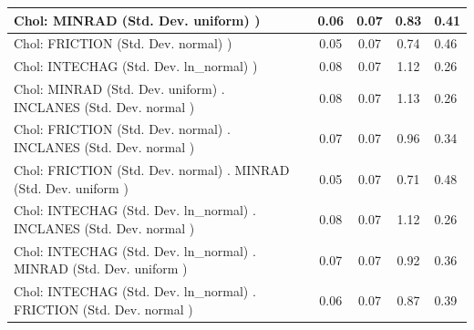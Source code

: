 \begin{table}
\begin{center}
\begin{tabular}{|l|l|c|c|c|l|}
			\hline
			 Chol: MINRAD (Std. Dev. uniform) ) &  & 0.06 & 0.07 & 0.83 & 0.41 \\
			\hline
			 Chol: FRICTION (Std. Dev. normal) ) &  & 0.05 & 0.07 & 0.74 & 0.46 \\
			\hline
			 Chol: INTECHAG (Std. Dev. ln_normal) ) &  & 0.08 & 0.07 & 1.12 & 0.26 \\
			\hline
			 Chol: MINRAD (Std. Dev. uniform) . INCLANES (Std. Dev.   normal ) &  & 0.08 & 0.07 & 1.13 & 0.26 \\
			\hline
			 Chol: FRICTION (Std. Dev. normal) . INCLANES (Std. Dev.   normal ) &  & 0.07 & 0.07 & 0.96 & 0.34 \\
			\hline
			 Chol: FRICTION (Std. Dev. normal) . MINRAD (Std. Dev.   uniform ) &  & 0.05 & 0.07 & 0.71 & 0.48 \\
			\hline
			 Chol: INTECHAG (Std. Dev. ln_normal) . INCLANES (Std. Dev.   normal ) &  & 0.08 & 0.07 & 1.12 & 0.26 \\
			\hline
			 Chol: INTECHAG (Std. Dev. ln_normal) . MINRAD (Std. Dev.   uniform ) &  & 0.07 & 0.07 & 0.92 & 0.36 \\
			\hline
			 Chol: INTECHAG (Std. Dev. ln_normal) . FRICTION (Std. Dev.   normal ) &  & 0.06 & 0.07 & 0.87 & 0.39 \\
			\hline
		\end{tabular}
	\end{center}
\end{table}